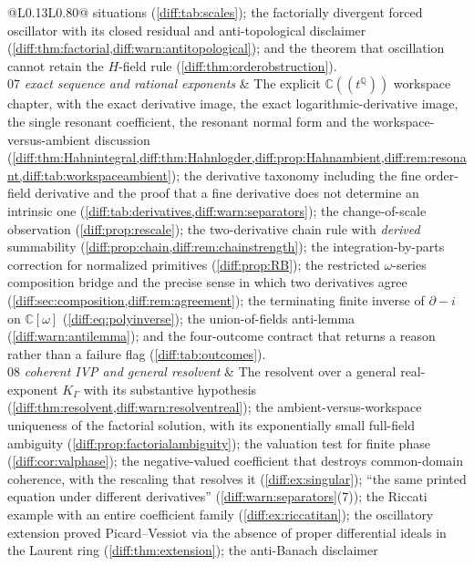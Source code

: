 \documentclass[11pt,letterpaper]{article}
\numberwithin{equation}{section}
\theoremstyle{definition}
\theoremstyle{remark}
\newcommand{\C}{\mathbb C}
\newcommand{\Q}{\mathbb Q}
\newcommand{\der}{\partial}
\begin{document}
\begin{longtable}{@{}L{0.13\textwidth}L{0.80\textwidth}@{}}
situations (\cref{diff:tab:scales}); the factorially divergent forced
oscillator with its closed residual and anti-topological disclaimer
(\cref{diff:thm:factorial,diff:warn:antitopological}); and the theorem that
oscillation cannot retain the $H$-field rule
(\cref{diff:thm:orderobstruction}). \\[0.3em]
07 \newline\emph{exact sequence and rational exponents} &
The explicit $\C((t^{\Q}))$ workspace chapter, with the exact derivative
image, the exact logarithmic-derivative image, the single resonant
coefficient, the resonant normal form and the workspace-versus-ambient
discussion
(\cref{diff:thm:Hahnintegral,diff:thm:Hahnlogder,diff:prop:Hahnambient,diff:rem:resonant,diff:tab:workspaceambient});
the derivative taxonomy including the fine order-field derivative and the
proof that a fine derivative does not determine an intrinsic one
(\cref{diff:tab:derivatives,diff:warn:separators}); the change-of-scale
observation (\cref{diff:prop:rescale}); the two-derivative chain rule with
\emph{derived} summability (\cref{diff:prop:chain,diff:rem:chainstrength});
the integration-by-parts correction for normalized primitives
(\cref{diff:prop:RB}); the restricted $\omega$-series composition bridge and
the precise sense in which two derivatives agree
(\cref{diff:sec:composition,diff:rem:agreement}); the terminating finite
inverse of $\der-i$ on $\C[\omega]$ (\cref{diff:eq:polyinverse}); the
union-of-fields anti-lemma (\cref{diff:warn:antilemma}); and the
four-outcome contract that returns a reason rather than a failure flag
(\cref{diff:tab:outcomes}). \\[0.3em]
08 \newline\emph{coherent IVP and general resolvent} &
The resolvent over a general real-exponent $K_{\Gamma}$ with its substantive
hypothesis (\cref{diff:thm:resolvent,diff:warn:resolventreal}); the
ambient-versus-workspace uniqueness of the factorial solution, with its
exponentially small full-field ambiguity
(\cref{diff:prop:factorialambiguity}); the valuation test for finite phase
(\cref{diff:cor:valphase}); the negative-valued coefficient that destroys
common-domain coherence, with the rescaling that resolves it
(\cref{diff:ex:singular}); ``the same printed equation under different
derivatives'' (\cref{diff:warn:separators}(7)); the Riccati example with an
entire coefficient family (\cref{diff:ex:riccatitan}); the oscillatory
extension proved Picard--Vessiot via the absence of proper differential ideals
in the Laurent ring (\cref{diff:thm:extension}); the anti-Banach disclaimer

\end{longtable}
\end{document}
